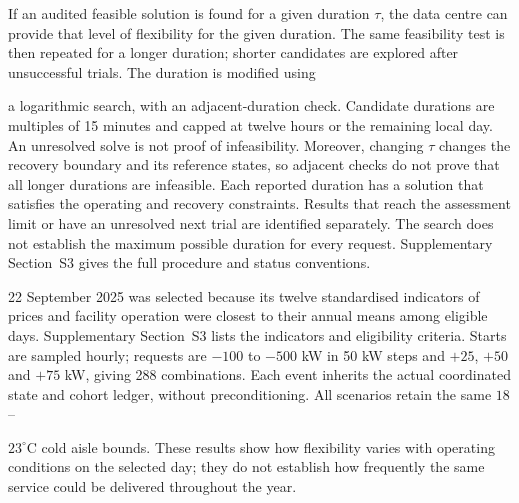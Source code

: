 \documentclass[lettersize,journal]{IEEEtran}
\providecommand{\DIFadd}[1]{{\color{blue}#1}}
\providecommand{\DIFaddbegin}{}
\providecommand{\DIFaddend}{}
\begin{document}
If  \DIFaddbegin \DIFadd{an audited feasible solution is found }\DIFaddend for a given duration $\tau$\DIFaddbegin \DIFadd{, the data centre }\DIFaddend can provide that level of flexibility for the given duration. The same feasibility test is then repeated for a longer duration\DIFaddbegin \DIFadd{; shorter candidates are explored after unsuccessful trials. The }\DIFaddend duration is modified using  \DIFaddbegin \DIFadd{a logarithmic search, with an adjacent-duration check. Candidate durations are multiples of 15 minutes and capped at twelve hours or the remaining local day. An unresolved solve is not proof of infeasibility. Moreover, changing $\tau$ changes the recovery boundary and its reference states, so adjacent checks do not prove that all longer durations are infeasible. Each reported duration has a solution that satisfies the operating and recovery constraints. Results that reach the assessment limit or have an unresolved next trial are identified separately. The search does not establish the maximum possible duration for every request. Supplementary Section~S3 gives the full procedure and status conventions.

}\DIFaddend 

 \DIFaddbegin \DIFadd{22 September 2025 was selected because its twelve standardised indicators of prices and facility operation were closest to their annual means among eligible days. Supplementary Section~S3 lists the indicators and eligibility criteria. Starts are sampled hourly; requests are $-100$ }\DIFaddend to \DIFaddbegin \DIFadd{$-500$ kW in 50 kW steps and $+25$, $+50$ and $+75$ kW, giving 288 combinations. Each event inherits the actual coordinated state and cohort ledger, without preconditioning. All scenarios retain the same }\DIFaddend $18$-- \DIFaddbegin \DIFadd{$23^\circ$C cold aisle bounds. These results show how flexibility varies with operating conditions on the selected day; they do not establish how frequently the same service could be delivered throughout the year.

}\DIFaddend 
\end{document}
